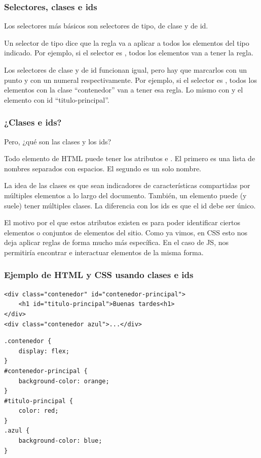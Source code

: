 \begin{frame}[fragile]
    \frametitle{Selectores, clases e ids}
    
    Los selectores más básicos son selectores de tipo, de clase y de id. 

    Un selector de tipo dice que la regla va a aplicar a todos los elementos 
    del tipo indicado. Por ejemplo, si el selector es , todos los 
    elementos  van a tener la regla.

    Los selectores de clase y de id funcionan igual, pero hay que marcarlos 
    con un punto y con un numeral respectivamente. Por ejemplo, si el 
    selector es , todos los elementos con la clase 
    ``contenedor'' van a tener esa regla. Lo mismo con  
    y el elemento con id ``titulo-principal''.

\end{frame}

\begin{frame}[fragile]
    \frametitle{¿Clases e ids?}
    
    Pero, ¿qué son las clases y los ids?

    Todo elemento de HTML puede tener los atributos  e 
    . El primero es una lista de nombres separados con espacios. 
    El segundo es un solo nombre.

    La idea de las clases es que sean indicadores de características compartidas 
    por múltiples elementos a lo largo del documento. También, un elemento puede 
    (y suele) tener múltiples clases. La diferencia con los ids es que el id debe 
    ser único. 

    El motivo por el que estos atributos existen es para poder identificar ciertos 
    elementos o conjuntos de elementos del sitio. Como ya vimos, en CSS esto nos 
    deja aplicar reglas de forma mucho más específica. En el caso de JS, nos 
    permitiría encontrar e interactuar elementos de la misma forma.

\end{frame}

\begin{frame}[fragile]
    \frametitle{Ejemplo de HTML y CSS usando clases e ids}
    
\begin{lstlisting}
<div class="contenedor" id="contenedor-principal">
    <h1 id="titulo-principal">Buenas tardes<h1>
</div>
<div class="contenedor azul">...</div>
\end{lstlisting}

\begin{lstlisting}
.contenedor {
    display: flex;
}
#contenedor-principal {
    background-color: orange;
}
#titulo-principal {
    color: red;
}
.azul {
    background-color: blue;
}
\end{lstlisting}

\end{frame}

